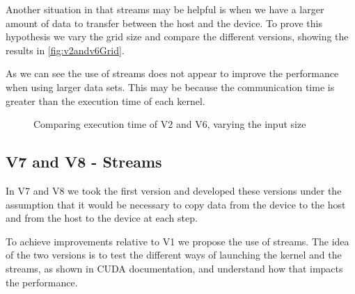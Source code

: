 \documentclass[conference]{IEEEtran}
\begin{document}
Another situation in that streams may be helpful is when we have a larger amount of data to transfer between the host and the device. To prove this hypothesis we vary the grid size and compare the different versions, showing the results in \autoref{fig:v2andv6Grid}.

As we can see the use of streams does not appear to improve the performance when using larger data sets. This may be because the communication time is greater than the execution time of each kernel.


\begin{figure}[ht]
  \centering
  \caption{Comparing execution time of V2 and V6, varying the input size}
  \label{fig:v2andv6Grid}
\end{figure}

\subsection{V7 and V8 - Streams}

In V7 and V8 we took the first version and developed these versions under the assumption that it would be necessary to copy data from the device to the host and from the host to the device at each step.

To achieve improvements relative to V1 we propose the use of streams. The idea of the two versions is to test the different ways of launching the kernel and the streams, as shown in CUDA documentation, and understand how that impacts the performance.\cite{HowOverlapData2012}
\end{document}
